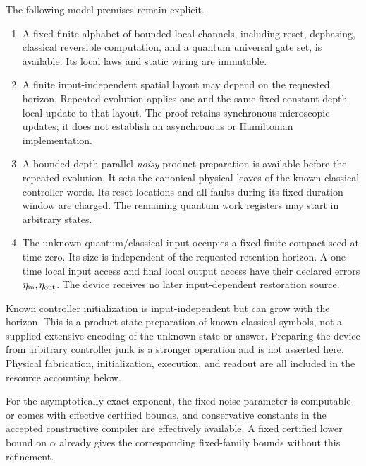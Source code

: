 \documentclass[11pt]{article}
\begin{document}
The following model premises remain explicit.
\begin{enumerate}
\item A fixed finite alphabet of bounded-local channels, including reset,
dephasing, classical reversible computation, and a quantum universal
gate set, is available. Its local laws and static wiring are immutable.
\item A finite input-independent spatial layout may depend on the
requested horizon. Repeated evolution applies one and the same fixed
constant-depth local update to that layout. The proof retains synchronous
microscopic updates; it does not establish an asynchronous or Hamiltonian
implementation.
\item A bounded-depth parallel \emph{noisy} product preparation is available
before the repeated evolution. It sets the canonical physical leaves of
the known classical controller words. Its reset locations and all faults
during its fixed-duration window are charged. The remaining quantum work
registers may start in arbitrary states.
\item The unknown quantum/classical input occupies a fixed finite compact
seed at time zero. Its size is independent of the requested retention
horizon. A one-time local input access and final local output access have
their declared errors $\eta_{\rm in},\eta_{\rm out}$. The device receives
no later input-dependent restoration source.
\end{enumerate}

Known controller initialization is input-independent but can grow with the
horizon. This is a product state preparation of known classical symbols,
not a supplied extensive encoding of the unknown state or answer. Preparing
the device from arbitrary controller junk is a stronger operation and is
not asserted here. Physical fabrication, initialization, execution, and
readout are all included in the resource accounting below.

For the asymptotically exact exponent, the fixed noise parameter is
computable or comes with effective certified bounds, and conservative
constants in the accepted constructive compiler are effectively available.
A fixed certified lower bound on $\alpha$ already gives the corresponding
fixed-family bounds without this refinement.
\end{document}
